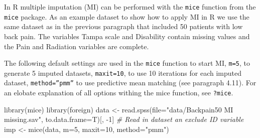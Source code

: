 \documentclass[
]{book}
\newenvironment{Shaded}{\begin{snugshade}}{\end{snugshade}}
\newcommand{\AttributeTok}[1]{\textcolor[rgb]{0.77,0.63,0.00}{#1}}
\newcommand{\CommentTok}[1]{\textcolor[rgb]{0.56,0.35,0.01}{\textit{#1}}}
\newcommand{\DecValTok}[1]{\textcolor[rgb]{0.00,0.00,0.81}{#1}}
\newcommand{\FunctionTok}[1]{\textcolor[rgb]{0.00,0.00,0.00}{#1}}
\newcommand{\NormalTok}[1]{#1}
\newcommand{\OtherTok}[1]{\textcolor[rgb]{0.56,0.35,0.01}{#1}}
\newcommand{\SpecialCharTok}[1]{\textcolor[rgb]{0.00,0.00,0.00}{#1}}
\newcommand{\StringTok}[1]{\textcolor[rgb]{0.31,0.60,0.02}{#1}}
\begin{document}
In R multiple imputation (MI) can be performed with the \texttt{mice} function from the \texttt{mice} package. As an example dataset to show how to apply MI in R we use the same dataset as in the previous paragraph that included 50 patients with low back pain. The variables Tampa scale and Disability contain missing values and the Pain and Radiation variables are complete.

The following default settings are used in the \texttt{mice} function to start MI, \texttt{m=5}, to generate 5 imputed datasets, \texttt{maxit=10}, to use 10 iterations for each imputed dataset, \texttt{method=”pmm”} to use predictive mean matching (see paragraph 4.11). For an elobate explanation of all options withing the mice function, see \texttt{?mice}.

\begin{Shaded}
\begin{Highlighting}[]
\FunctionTok{library}\NormalTok{(mice)}
\FunctionTok{library}\NormalTok{(foreign)}
\NormalTok{data }\OtherTok{\textless{}{-}} \FunctionTok{read.spss}\NormalTok{(}\AttributeTok{file=}\StringTok{"data/Backpain50 MI missing.sav"}\NormalTok{, }\AttributeTok{to.data.frame=}\NormalTok{T)[, }\SpecialCharTok{{-}}\DecValTok{1}\NormalTok{] }\CommentTok{\# Read in dataset an exclude ID variable}
\NormalTok{imp }\OtherTok{\textless{}{-}} \FunctionTok{mice}\NormalTok{(data, }\AttributeTok{m=}\DecValTok{5}\NormalTok{, }\AttributeTok{maxit=}\DecValTok{10}\NormalTok{, }\AttributeTok{method=}\StringTok{"pmm"}\NormalTok{)}
\end{Highlighting}
\end{Shaded}
\end{document}
